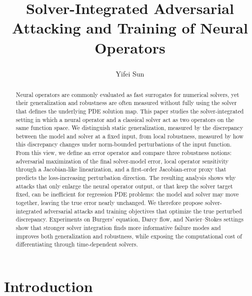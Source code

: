 \documentclass[letterpaper]{article} %
\title{Solver-Integrated Adversarial Attacking and Training of Neural Operators}
\author{
  Yifei Sun\textsuperscript{\dag}
}
\begin{document}
\maketitle
\begingroup
\renewcommand{\thefootnote}{\fnsymbol{footnote}}
\endgroup

\begin{abstract}
Neural operators are commonly evaluated as fast surrogates for numerical
solvers, yet their generalization and robustness are often measured without
fully using the solver that defines the underlying PDE solution map. This paper
studies the solver-integrated setting in which a neural operator and a
classical solver act as two operators on the same function space. We distinguish
static generalization, measured by the discrepancy between the model and solver
at a fixed input, from local robustness, measured by how this discrepancy
changes under norm-bounded perturbations of the input function. From this view,
we define an error operator and compare three robustness notions: adversarial
maximization of the final solver-model error, local operator sensitivity through
a Jacobian-like linearization, and a first-order Jacobian-error proxy that
predicts the loss-increasing perturbation direction. The resulting analysis
shows why attacks that only enlarge the neural operator output, or that keep
the solver target fixed, can be inefficient for regression PDE problems: the
model and solver may move together, leaving the true error nearly unchanged. We
therefore propose solver-integrated adversarial attacks and training objectives
that optimize the true perturbed discrepancy. Experiments on Burgers' equation,
Darcy flow, and Navier--Stokes settings show that stronger solver integration
finds more informative failure modes and improves both generalization and
robustness, while exposing the computational cost of differentiating through
time-dependent solvers.
\end{abstract}

\section{Introduction}
\end{document}
